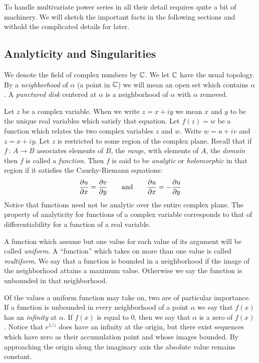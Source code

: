 To handle multivariate power series in all their detail requires
quite a bit of machinery.  We will sketch the important facts in the
following sections and withold the complicated details for later.

\subsection{Analyticity and Singularities}

We denote the field of complex numbers by $\mathbb{C}$.  We let $\mathbb{C}$ have the usual
topology.  By a  {\em neighborhood} of $\alpha$ (a point in $\mathbb{C}$) we will
mean an open set which contains $\alpha$.  A {\em punctured disk} centered
at $\alpha$ is a neighborhood of $\alpha$ with $\alpha$ removed.

Let $z$ be a complex variable.  When we write $z = x + iy$
we mean $x$ and $y$ to be the unique real variables which satisfy that
equation.  Let $f(z) = w$ be a function which relates the two complex 
variables $z$ and $w$.  Write $w = u + iv$ and $z = x + iy$.
Let $z$ is restricted to some region of the complex plane.  Recall that if
$f\, :\, A \rightarrow B$ associates elements of $B$, the {\em range}, with
elements of $A$, the {\em domain} then $f$ is called a {\em function}.  
Then $f$ is said to be {\em analytic} or {\em holomorphic}
in that region if it satisfies the Cauchy-Riemann equations: 
\[
{\partial u \over \partial x} = {\partial v \over \partial y}
\qquad \hbox{and} \qquad
{\partial u \over \partial x} = -{\partial u \over \partial y}
\]
Notice that functions need not be analytic over the entire complex plane.
The property of analyticity for functions of a complex variable corresponds
to that of differentiability for a function of a real variable.

A function which assume but one value for each value of its argument
will be called {\em uniform\/}.  A ``function'' which takes on more than one
value is called {\em multiform\/}.  We say that a function is bounded in a
neighborhood if the image of the neighborhood attains a maximum value.
Otherwise we say the function is unbounded in that neighborhood.

Of the values a uniform function may take on, two are of particular
importance.  If a function is unbounded in every neighborhood of a point
$\alpha$ we say that $f(x)$ has an {\em infinity} at $\alpha$.  If $f(x)$
is equal to 0, then we say that $\alpha$ is a zero of $f(x)$.
Notice that $e^{1/z}$ does have an infinity at the origin, but there 
exist sequences which have zero as their accumulation point and whose
images bounded.  By approaching the origin along the imaginary axis
the absolute value remains constant.

